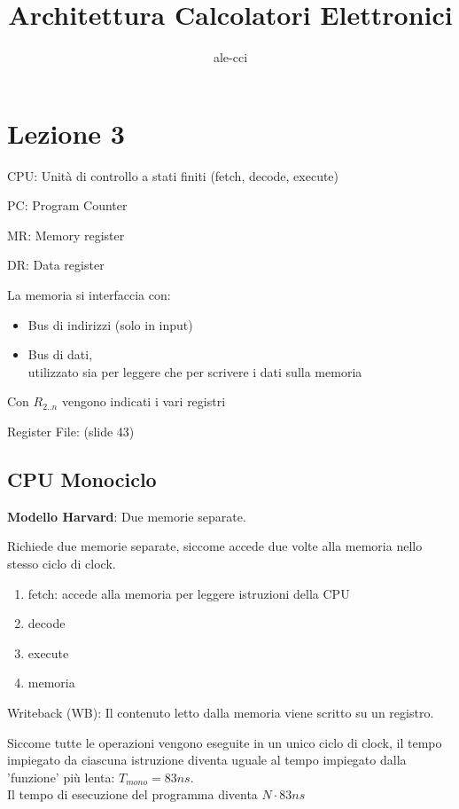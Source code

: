 \documentclass[a4paper,10pt]{article}
\title{Architettura Calcolatori Elettronici}
\author{ale-cci}
\begin{document}
\maketitle{}





\section{Lezione 3}
CPU: Unità di controllo a stati finiti (fetch, decode, execute)

PC: Program Counter

MR: Memory register

DR: Data register

La memoria si interfaccia con:
\begin{itemize}
    \item Bus di indirizzi (solo in input)
    \item Bus di dati, \\utilizzato sia per leggere che per scrivere i dati sulla memoria
\end{itemize}

Con $R_{2..n}$ vengono indicati i vari registri

Register File: (slide 43)

\subsection{CPU Monociclo}
\textbf{Modello Harvard}: Due memorie separate.%

Richiede due memorie separate, siccome accede due volte alla memoria nello stesso ciclo di clock.

\begin{enumerate}
    \item fetch: accede alla memoria per leggere istruzioni della CPU
    \item decode
    \item execute
    \item memoria
\end{enumerate}

Writeback (WB): Il contenuto letto dalla memoria viene scritto su un registro.

Siccome tutte le operazioni vengono eseguite in un unico ciclo di clock, il tempo impiegato da ciascuna istruzione diventa uguale al tempo impiegato dalla 'funzione' più lenta: $T_{mono} = 83 ns$.
\\
Il tempo di esecuzione del programma diventa $N \cdot 83ns$
\end{document}
